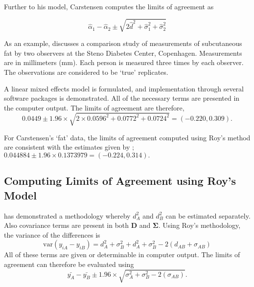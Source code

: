 \documentclass[12pt, a4paper]{report}
\theoremstyle{plain}
\theoremstyle{definition}
\theoremstyle{remark}
\begin{document}
Further to his model, Carstensen computes the limits of agreement
as

\[
\hat{\alpha}_1 - \hat{\alpha}_2 \pm \sqrt{2 \hat{d}^2 + 	\hat{\sigma}^2_1 + \hat{\sigma}^2_2}
\]



%
As an example, \citet{BXC2008} discusses a comparison study of measurements of subcutaneous fat
by two observers at the Steno Diabetes Center, Copenhagen. Measurements are in millimeters
(mm). Each person is measured three times by each observer. The observations are considered to be `true' replicates.

A linear mixed effects model is formulated, and implementation through several software packages is demonstrated.
All of the necessary terms are presented in the computer output. The limits of agreement are therefore,
\begin{equation}
	0.0449  \pm 1.96 \times  \sqrt{2 \times 0.0596^2 + 0.0772^2 + 0.0724^2} = (-0.220,  0.309).
\end{equation}

For Carstensen's `fat' data, the limits of agreement computed using Roy's
method are consistent with the estimates given by \citet{BXC2008}; $0.044884  \pm 1.96 \times  0.1373979 = (-0.224,  0.314).$





\subsection{Computing Limits of Agreement using Roy's Model}
\citet{ARoy2009} has demonstrated a methodology whereby $d^2_{A}$ and $d^2_{B}$ can be estimated separately. Also covariance terms are present in both $\boldsymbol{D}$ and $\boldsymbol{\Sigma}$. Using Roy's methodology, the variance of the differences is
\begin{equation}
\mbox{var} (y_{iA}-y_{iB})= d^2_{A} + \sigma^2_{B} + d^2_{A} + \sigma^2_{B} - 2(d_{AB} + \sigma_{AB})
\end{equation}
All of these terms are given or determinable in computer output.
The limits of agreement can therefore be evaluated using
\begin{equation}
\bar{y_{A}}-\bar{y_{B}} \pm 1.96 \times \sqrt{ \sigma^2_{A} + \sigma^2_{B}  - 2(\sigma_{AB})}.
\end{equation}
\end{document}
